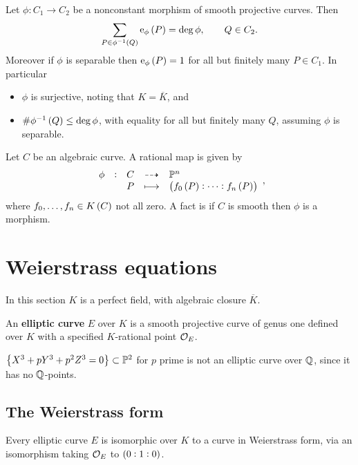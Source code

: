 \begin{theorem}
\label{thm:2.8}
Let $ \phi : C_1 \to C_2 $ be a nonconstant morphism of smooth projective curves. Then
$$ \sum_{P \in \phi^{-1}\br{Q}} \e_\phi\br{P} = \deg \phi, \qquad Q \in C_2. $$
Moreover if $ \phi $ is separable then $ \e_\phi\br{P} = 1 $ for all but finitely many $ P \in C_1 $. In particular
\begin{itemize}
\item $ \phi $ is surjective, noting that $ K = \overline{K} $, and
\item $ \#\phi^{-1}\br{Q} \le \deg \phi $, with equality for all but finitely many $ Q $, assuming $ \phi $ is separable.
\end{itemize}
\end{theorem}

\begin{remark}
\label{rem:2.9}
Let $ C $ be an algebraic curve. A rational map is given by
$$ \rational[\phi]{C}{\PP^n}{P}{\br{f_0\br{P} : \dots : f_n\br{P}}}, $$
where $ f_0, \dots, f_n \in K\br{C} $ not all zero. A fact is if $ C $ is smooth then $ \phi $ is a morphism.
\end{remark}

\pagebreak

\section{Weierstrass equations}

In this section $ K $ is a perfect field, with algebraic closure $ \overline{K} $.

\begin{definition*}
An \textbf{elliptic curve} $ E $ over $ K $ is a smooth projective curve of genus one defined over $ K $ with a specified $ K $-rational point $ \mathcal{O}_E $.
\end{definition*}

\begin{example*}
$ \cbr{X^3 + pY^3 + p^2Z^3 = 0} \subset \PP^2 $ for $ p $ prime is not an elliptic curve over $ \mathbb{Q} $, since it has no $ \mathbb{Q} $-points.
\end{example*}

\subsection{The Weierstrass form}

\begin{theorem}
\label{thm:3.1}
Every elliptic curve $ E $ is isomorphic over $ K $ to a curve in Weierstrass form, via an isomorphism taking $ \mathcal{O}_E $ to $ \br{0 : 1 : 0} $.
\end{theorem}

